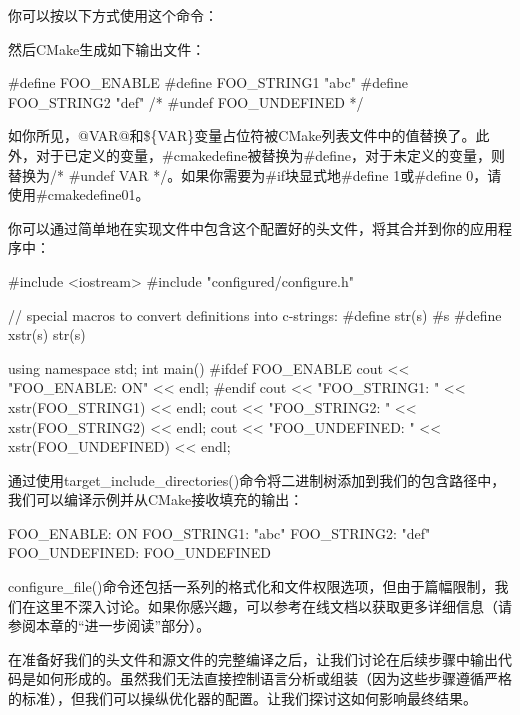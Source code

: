你可以按以下方式使用这个命令：



然后CMake生成如下输出文件：


\begin{cpp}
#define FOO_ENABLE
#define FOO_STRING1 "abc"
#define FOO_STRING2 "def"
/* #undef FOO_UNDEFINED */
\end{cpp}

如你所见，@VAR@和\$\{VAR\}变量占位符被CMake列表文件中的值替换了。此外，对于已定义的变量，\#cmakedefine被替换为\#define，对于未定义的变量，则替换为/* \#undef VAR */。如果你需要为\#if块显式地\#define 1或\#define 0，请使用\#cmakedefine01。

你可以通过简单地在实现文件中包含这个配置好的头文件，将其合并到你的应用程序中：


\begin{cpp}
#include <iostream>
#include "configured/configure.h"

// special macros to convert definitions into c-strings:
#define str(s) #s
#define xstr(s) str(s)

using namespace std;
int main()
{
#ifdef FOO_ENABLE
    cout << "FOO_ENABLE: ON" << endl;
#endif
    cout << "FOO_STRING1: " << xstr(FOO_STRING1) << endl;
    cout << "FOO_STRING2: " << xstr(FOO_STRING2) << endl;
    cout << "FOO_UNDEFINED: " << xstr(FOO_UNDEFINED) << endl;
}
\end{cpp}

通过使用target\_include\_directories()命令将二进制树添加到我们的包含路径中，我们可以编译示例并从CMake接收填充的输出：

\begin{shell}
FOO_ENABLE: ON
FOO_STRING1: "abc"
FOO_STRING2: "def"
FOO_UNDEFINED: FOO_UNDEFINED
\end{shell}

configure\_file()命令还包括一系列的格式化和文件权限选项，但由于篇幅限制，我们在这里不深入讨论。如果你感兴趣，可以参考在线文档以获取更多详细信息（请参阅本章的“进一步阅读”部分）。

在准备好我们的头文件和源文件的完整编译之后，让我们讨论在后续步骤中输出代码是如何形成的。虽然我们无法直接控制语言分析或组装（因为这些步骤遵循严格的标准），但我们可以操纵优化器的配置。让我们探讨这如何影响最终结果。






